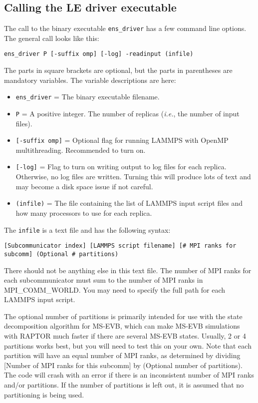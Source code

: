\documentclass[10pt]{article}
\begin{document}
\subsection{Calling the LE driver executable}\label{ssec:running_REUS}

The call to the binary executable \texttt{ens\_driver} has a few command line options.
The general call looks like this:
\begin{verbatim}
ens_driver P [-suffix omp] [-log] -readinput (infile)
\end{verbatim}
The parts in square brackets are optional, but the parts in parentheses are mandatory variables. 
The variable descriptions are here:
\begin{itemize}
\item	\texttt{ens\_driver} = The binary executable filename.
\item	\texttt{P} = A positive integer. 
		The number of replicas ({\em i.e.}, the number of input files).
\item	\texttt{[-suffix omp]} = Optional flag for running LAMMPS with OpenMP multithreading.
		Recommended to turn on.
\item	\texttt{[-log]} = Flag to turn on writing output to log files for each replica. Otherwise,
		no log files are written. Turning this will produce lots of text and may become a 
		disk space issue if not careful.
\item	\texttt{(infile)} = The file containing the list of LAMMPS input script files and how many
		processors to use for each replica.
\end{itemize}

The \texttt{infile} is a text file and has the following syntax:
\begin{verbatim}
[Subcommunicator index] [LAMMPS script filename] [# MPI ranks for subcomm] (Optional # partitions)
\end{verbatim}
There should not be anything else in this text file. The number of MPI ranks
for each subcommunicator must sum to the number of MPI ranks in MPI\_COMM\_WORLD. You
may need to specify the full path for each LAMMPS input script.

The optional number of partitions is primarily intended for use with the state decomposition algorithm for MS-EVB, which
can make MS-EVB simulations with RAPTOR much faster if there are several MS-EVB states. Usually, 2 or 4 partitions works
best, but you will need to test this on your own. Note that each partition will have an equal number of MPI ranks, as determined
by dividing [Number of MPI ranks for this subcomm] by (Optional number of partitions). The code will crash with an error if
there is an inconsistent number of MPI ranks and/or partitions. If the number of partitions is left out, it is assumed that
no partitioning is being used.
\end{document}

